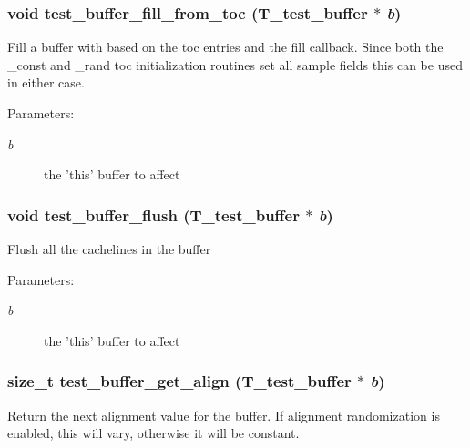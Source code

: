 \subsubsection{\setlength{\rightskip}{0pt plus 5cm}void test\_\-buffer\_\-fill\_\-from\_\-toc ({\bf T\_\-test\_\-buffer} $\ast$ {\em b})}\label{group__test__buffer_a3}


Fill a buffer with based on the toc entries and the fill callback. Since both the \_\-const and \_\-rand toc initialization routines set all sample fields this can be used in either case.

\begin{Desc}
\item[Parameters: ]\par
\begin{description}
\item[{\em 
b}]the 'this' buffer to affect \end{description}
\end{Desc}
\subsubsection{\setlength{\rightskip}{0pt plus 5cm}void test\_\-buffer\_\-flush ({\bf T\_\-test\_\-buffer} $\ast$ {\em b})}\label{group__test__buffer_a7}


Flush all the cachelines in the buffer \begin{Desc}
\item[Parameters: ]\par
\begin{description}
\item[{\em 
b}]the 'this' buffer to affect \end{description}
\end{Desc}
\subsubsection{\setlength{\rightskip}{0pt plus 5cm}size\_\-t test\_\-buffer\_\-get\_\-align ({\bf T\_\-test\_\-buffer} $\ast$ {\em b})}\label{group__test__buffer_a0}


Return the next alignment value for the buffer. If alignment randomization is enabled, this will vary, otherwise it will be constant.

